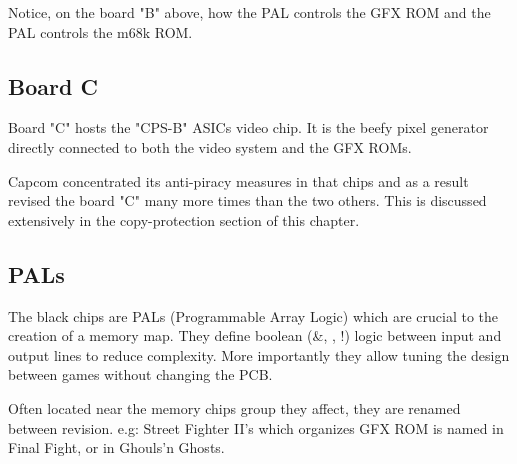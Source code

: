 


Notice, on the board "B" above, how the PAL  controls the GFX ROM and the PAL  controls the m68k ROM.



\subsection{Board C}
Board "C" hosts the "CPS-B" ASICs video chip. It is the beefy pixel generator directly connected to both the video system and the GFX ROMs.

Capcom concentrated its anti-piracy measures in that chips and as a result revised the board "C" many more times than the two others. This is discussed extensively in the copy-protection section of this chapter.


\begin{minipage}[t]{0.49\linewidth}
\end{minipage}%
\hfill%
\begin{minipage}[t]{0.49\linewidth}
\end{minipage}

\subsection{PALs}
The black chips are PALs (Programmable Array Logic) which are crucial to the creation of a memory map. They define boolean (\&, \textbar, !) logic between input and output lines to reduce complexity. More importantly they allow tuning the design between games without changing the PCB.


 Often located near the memory chips group they affect, they are renamed between revision. e.g: Street Fighter II's  which organizes GFX ROM is named  in Final Fight, or  in Ghouls'n Ghosts.



